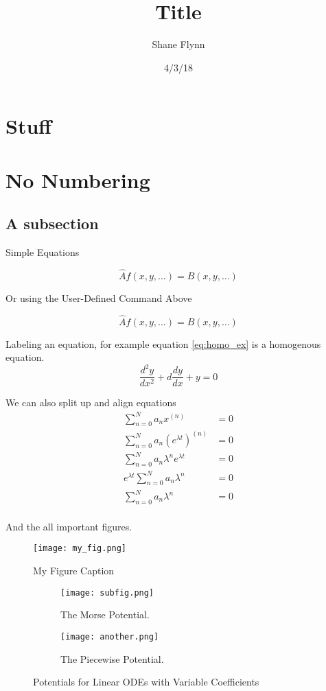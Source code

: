 \documentclass{article}
\title{Title}
\date{4/3/18}
\author{Shane Flynn}
\newcommand{\be}{\begin{equation}}
\newcommand{\ee}{\end{equation}}
\begin{document}
\maketitle

\section{Stuff}

\section*{No Numbering}

\subsection{A subsection}
Simple Equations

\begin{equation}
\hat{A} f(x,y,\hdots) = B(x,y,\hdots)
\end{equation}

Or using the User-Defined Command Above

\be
\hat{A} f(x,y,\hdots) = B(x,y,\hdots)
\ee

Labeling an equation, for example equation \ref{eq:homo_ex} is a homogenous equation. 
\be \label{eq:homo_ex}
\frac{d^2y}{dx^2} + d\frac{dy}{dx} + y = 0
\ee

We can also split up and align equations
\be
\begin{split}
    \sum_{n=0}^N a_nx^{(n)} &= 0\\
    \sum_{n=0}^N a_n \left(e^{\lambda t}\right) ^{(n)} &= 0\\
    \sum_{n=0}^N a_n \lambda^n e^{\lambda t} &= 0\\
    e^{\lambda t} \sum_{n=0}^N a_n \lambda^n &= 0\\
    \sum_{n=0}^N a_n \lambda^n &= 0\\
\end{split}
\ee

And the all important figures. 
\begin{figure}[h]
  \centering
  \texttt{[image: my\_fig.png]}
    \caption{My Figure Caption}
  \label{fig:under_damped}
\end{figure}

\begin{figure}[H]
    \centering
    \begin{subfigure}[b]{0.49\textwidth}
        \texttt{[image: subfig.png]}
  	\caption{The Morse Potential.} 
    \end{subfigure}
    \begin{subfigure}[b]{0.49\textwidth}
        \texttt{[image: another.png]}
        \caption{The Piecewise Potential.}
    \end{subfigure}
    \caption{Potentials for Linear ODEs with Variable Coefficients}
\end{figure}
\end{document}
